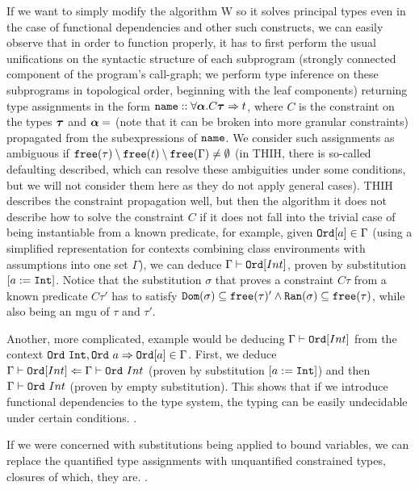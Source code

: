 If we want to simply modify the algorithm W so it solves principal types even in the case of functional dependencies and other such constructs, we can easily observe that in order to function properly, it has to first perform the usual unifications on the syntactic structure of each subprogram (strongly connected component of the program's call-graph; we perform type inference on these subprograms in topological order, beginning with the leaf components) returning type assignments in the form $\mathtt{name} :: \forall \boldsymbol{\alpha} . C \boldsymbol{\tau} \Rightarrow t$, where $C$ is the constraint on the types $\boldsymbol{\tau}$ and $\boldsymbol{\alpha} = $ (note that it can be broken into more granular constraints) propagated from the subexpressions of $\mathtt{name}$. We consider such assignments as ambiguous if $\mathtt{free} (\tau) \setminus \mathtt{free} (t) \setminus \mathtt{free} (\Gamma) \neq \emptyset$ (in THIH, there is so-called defaulting described, which can resolve these ambiguities under some conditions, but we will not consider them here as they do not apply general cases). THIH describes the constraint propagation well, but then the algorithm it does not describe how to solve the constraint $C$ if it does not fall into the trivial case of being instantiable from a known predicate, for example, given $\mathtt{Ord} [a] \in \Gamma$ (using a simplified representation for contexts combining class environments with assumptions into one set $\Gamma$), we can deduce $\Gamma \vdash \mathtt{Ord} [Int]$, proven by substitution $[a := \mathtt{Int}]$. Notice that the substitution $\sigma$ that proves a constraint $C \tau$ from a known predicate $C \tau'$ has to satisfy $\mathtt{Dom} (\sigma) \subseteq \mathtt{free} (\tau)' \land \mathtt{Ran} (\sigma) \subseteq \mathtt{free} (\tau)$, while also being an mgu  of $\tau$ and $\tau'$.  

Another, more complicated, example would be deducing $\Gamma \vdash \mathtt{Ord} [Int]$ from the context $\mathtt{Ord}\ \mathtt{Int}, \mathtt{Ord}\ a \Rightarrow \mathtt{Ord} [a] \in \Gamma$. First, we deduce $\Gamma \vdash \mathtt{Ord} [Int] \Leftarrow \Gamma \vdash \mathtt{Ord}\ Int$ (proven by substitution $[a := \mathtt{Int}]$) and then $\Gamma \vdash \mathtt{Ord}\ Int$ (proven by empty substitution). This shows that if we introduce functional dependencies to the type system, the typing can be easily undecidable under certain conditions. .

If we were concerned with substitutions being applied to bound variables, we can replace the quantified type assignments with unquantified constrained types, closures of which, they are. .

